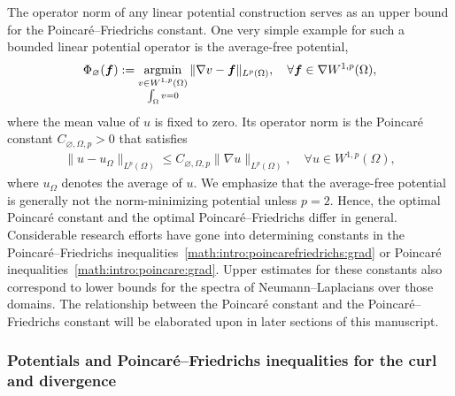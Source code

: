 \documentclass[10pt,a4paper]{article}
\begin{document}
The operator norm of any linear potential construction serves as an upper bound for the Poincar\'e--Friedrichs constant. 
One very simple example for such a bounded linear potential operator is the average-free potential, 
\begin{align}\label{math:intro:poincarepotential}
    \Phi_{\varnothing}( \bm{f} ) 
    := 
    \operatorname*{{\rm argmin}}\limits_{ \substack{ v \in W^{1,p}(\Omega) \\ \int_\Omega v = 0 } } \| \nabla v - \bm{f} \|_{L^{p}(\Omega)},
    \quad 
    \forall 
    \bm{f} \in \nabla W^{1,p}(\Omega)
    ,
\end{align} 
where the mean value of $u$ is fixed to zero. 
Its operator norm is the Poincar\'e constant $C_{\varnothing,\Omega,p} > 0$ that satisfies %
\begin{align}\label{math:intro:poincare:grad}
    \| u - u_{\Omega} \|_{L^{p}(\Omega)}
    \leq 
    C_{\varnothing,\Omega,p} \| \nabla u \|_{L^{p}(\Omega)},
    \quad 
    \forall 
    u \in W^{1,p}(\Omega)
    , \tag{P} 
\end{align}
where $u_\Omega$ denotes the average of $u$. We emphasize that the average-free potential is generally not the norm-minimizing potential unless $p = 2$.
Hence, the optimal Poincar\'e constant and the optimal Poincar\'e--Friedrichs differ in general. 
Considerable research efforts have gone into determining constants in the Poincar\'e--Friedrichs inequalities~\eqref{math:intro:poincarefriedrichs:grad} or Poincar\'e inequalities~\eqref{math:intro:poincare:grad}. Upper estimates for these constants also correspond to lower bounds for the spectra of Neumann--Laplacians over those domains. 
The relationship between the Poincar\'e constant and the Poincar\'e--Friedrichs constant will be elaborated upon in later sections of this manuscript. 



\subsubsection{Potentials and Poincar\'e--Friedrichs inequalities for the curl and divergence}
\end{document}
